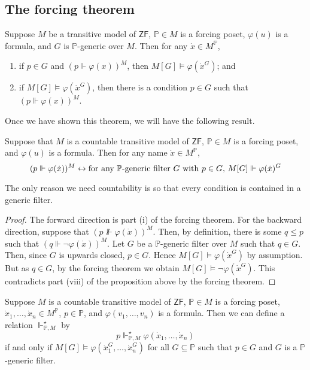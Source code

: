 \subsection{The forcing theorem}
\begin{theorem}
    Suppose \( M \) be a transitive model of \( \mathsf{ZF} \), \( \mathbb P \in M \) is a forcing poset, \( \varphi(u) \) is a formula, and \( G \) is \( \mathbb P \)-generic over \( M \).
    Then for any \( \dot x \in M^{\mathbb P} \),
    \begin{enumerate}
        \item if \( p \in G \) and \( (p \Vdash \varphi(x))^M \), then \( M[G] \vDash \varphi(\dot x^G) \); and
        \item if \( M[G] \vDash \varphi(\dot x^G) \), then there is a condition \( p \in G \) such that \( (p \Vdash \varphi(x))^M \).
    \end{enumerate}
\end{theorem}
Once we have shown this theorem, we will have the following result.
\begin{corollary}
    Suppose that \( M \) is a countable transitive model of \( \mathsf{ZF} \), \( \mathbb P \in M \) is a forcing poset, and \( \varphi(u) \) is a formula.
    Then for any name \( \dot x \in M^{\mathbb P} \),
    \[ (p \Vdash \varphi(\dot x))^M \leftrightarrow \text{for any \( \mathbb P \)-generic filter \( G \) with \( p \in G \), } M[G] \Vdash \varphi(\dot x)^G \]
\end{corollary}
The only reason we need countability is so that every condition is contained in a generic filter.
\begin{proof}
    The forward direction is part (i) of the forcing theorem.
    For the backward direction, suppose that \( (p \nVdash \varphi(\dot x))^M \).
    Then, by definition, there is some \( q \leq p \) such that \( (q \Vdash \neg\varphi(\dot x))^M \).
    Let \( G \) be a \( \mathbb P \)-generic filter over \( M \) such that \( q \in G \).
    Then, since \( G \) is upwards closed, \( p \in G \).
    Hence \( M[G] \vDash \varphi(\dot x^G) \) by assumption.
    But as \( q \in G \), by the forcing theorem we obtain \( M[G] \vDash \neg\varphi(\dot x^G) \).
    This contradicts part (viii) of the proposition above by the forcing theorem.
\end{proof}
\begin{definition}
    Suppose \( M \) is a countable transitive model of \( \mathsf{ZF} \), \( \mathbb P \in M \) is a forcing poset, \( \dot x_1, \dots, \dot x_n \in M^{\mathbb P} \), \( p \in \mathbb P \), and \( \varphi(v_1, \dots, v_n) \) is a formula.
    Then we can define a relation \( \Vdash^\star_{\mathbb P, M} \) by
    \[ p \Vdash^\star_{\mathbb P, M} \varphi(\dot x_1, \dots, \dot x_n) \]
    if and only if \( M[G] \vDash \varphi(\dot x_1^G, \dots, \dot x_n^G) \) for all \( G \subseteq \mathbb P \) such that \( p \in G \) and \( G \) is a \( \mathbb P \)-generic filter.
\end{definition}
